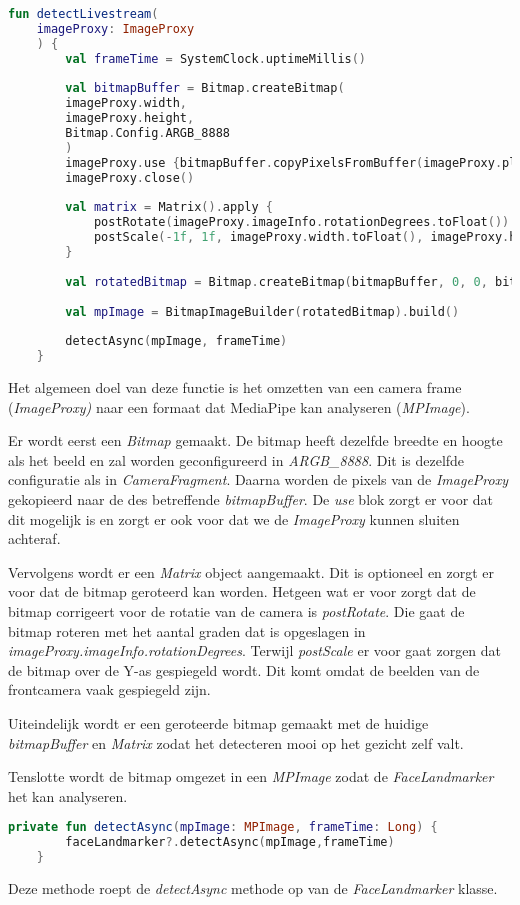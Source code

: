 \begin{lstlisting}[language=Kotlin, caption=detectLivestream in FaceLandmarkerHelper.kt]
    fun detectLivestream(
    imageProxy: ImageProxy
    ) {
        val frameTime = SystemClock.uptimeMillis()
        
        val bitmapBuffer = Bitmap.createBitmap(
        imageProxy.width,
        imageProxy.height,
        Bitmap.Config.ARGB_8888
        )
        imageProxy.use {bitmapBuffer.copyPixelsFromBuffer(imageProxy.planes[0].buffer)}
        imageProxy.close()
        
        val matrix = Matrix().apply {
            postRotate(imageProxy.imageInfo.rotationDegrees.toFloat())
            postScale(-1f, 1f, imageProxy.width.toFloat(), imageProxy.height.toFloat())
        }
        
        val rotatedBitmap = Bitmap.createBitmap(bitmapBuffer, 0, 0, bitmapBuffer.width, bitmapBuffer.height, matrix, true)
        
        val mpImage = BitmapImageBuilder(rotatedBitmap).build()
        
        detectAsync(mpImage, frameTime)
    }
\end{lstlisting}
Het algemeen doel van deze functie is het omzetten van een camera frame (\emph{ImageProxy)} naar een formaat dat MediaPipe kan analyseren (\emph{MPImage}).

Er wordt eerst een \emph{Bitmap} gemaakt. De bitmap heeft dezelfde breedte en hoogte als het beeld en zal worden geconfigureerd in \emph{ARGB\_8888}. Dit is dezelfde configuratie als in \emph{CameraFragment}. Daarna worden de pixels van de \emph{ImageProxy} gekopieerd naar de des betreffende \emph{bitmapBuffer}. De \emph{use} blok zorgt er voor dat dit mogelijk is en zorgt er ook voor dat we de \emph{ImageProxy} kunnen sluiten achteraf.

Vervolgens wordt er een \emph{Matrix} object aangemaakt. Dit is optioneel en zorgt er voor dat de bitmap geroteerd kan worden. Hetgeen wat er voor zorgt dat de bitmap corrigeert voor de rotatie van de camera is \emph{postRotate}. Die gaat de bitmap roteren met het aantal graden dat is opgeslagen in \emph{imageProxy.imageInfo.rotationDegrees}. Terwijl \emph{postScale} er voor gaat zorgen dat de bitmap over de Y-as gespiegeld wordt. Dit komt omdat de beelden van de frontcamera vaak gespiegeld zijn.

Uiteindelijk wordt er een geroteerde bitmap gemaakt met de huidige \emph{bitmapBuffer} en \emph{Matrix} zodat het detecteren mooi op het gezicht zelf valt.

Tenslotte wordt de bitmap omgezet in een \emph{MPImage} zodat de \emph{FaceLandmarker} het kan analyseren.

\begin{lstlisting}[language=Kotlin, caption=detectAsync in FaceLandmarkerHelper.kt]
    private fun detectAsync(mpImage: MPImage, frameTime: Long) {
        faceLandmarker?.detectAsync(mpImage,frameTime)
    }
\end{lstlisting}
Deze methode roept de \emph{detectAsync} methode op van de \emph{FaceLandmarker} klasse.

